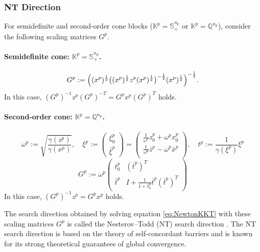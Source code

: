 \subsubsection{NT Direction}
For semidefinite and second-order cone blocks ($\mathbb{K}^p = \mathbb{S}^{n_p}_+$ or $\mathbb{K}^p = \mathbb{Q}^{n_p}$), consider the following scaling matrices $G^p$.

\paragraph{Semidefinite cone: \(\mathbb{K}^p = \mathbb{S}^{n_p}_+\).}
\[
  G^p 
  := 
    \Bigl( (x^p)^{\frac12} \bigl( (x^p)^{\frac12} z^p (x^p)^{\frac12} \bigr)^{-\frac12} (x^p)^{\frac12} \Bigr)^{-\frac12}.
\]
In this case, $(G^p)^{-1} z^p (G^p)^{-T} = G^p x^p (G^p)^T$ holds. 

\paragraph{Second-order cone: \(\mathbb{K}^p = \mathbb{Q}^{n_p}\).}
\begin{equation}
    \omega^p := \sqrt{\frac{\gamma(z^p)}{\gamma(x^p)}}, 
    \quad 
    \xi^p 
    := \begin{pmatrix} \xi^p_0 \\ \bar{\xi}^p \end{pmatrix} 
    = \begin{pmatrix}
        \frac{1}{\omega^p} z^p_0 + \omega^p x^p_0 \\
        \frac{1}{\omega^p} \bar{z}^p - \omega^p \bar{x}^p \\
    \end{pmatrix},
    \quad
    t^p := \frac{1}{\gamma(\xi^p)}\xi^p
    \label{eq:scaling_mat_NT_socp_aux}
\end{equation}
\begin{equation}
    G^p := \omega^p \begin{pmatrix}
        t^p_0 & (\bar{t}^p)^T \\
        \bar{t}^p & I+\frac{1}{1 + t^p_0} \bar{t}^p(\bar{t}^p)^T
    \end{pmatrix}
    \label{eq:scaling_mat_NT_socp}
\end{equation}
In this case, $(G^p)^{-1} z^p = G^p x^p$ holds.

\medskip 

The search direction obtained by solving equation \eqref{eq:NewtonKKT} with these scaling matrices $G^p$ is called the Nesterov--Todd (NT) search direction \cite{Nesterov1997,todd1998}. 
The NT search direction is based on the theory of self-concordant barriers and is known for its strong theoretical guarantees of global convergence.

